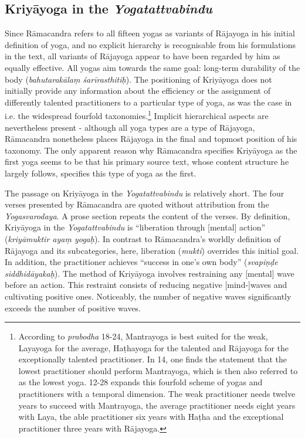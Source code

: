 \subsection{Kriyāyoga in the \textit{Yogatattvabindu}}
\label{kriyaintro}
Since Rāmacandra refers to all fifteen yogas as variants of Rājayoga in his initial definition of yoga, and no explicit hierarchy is recognisable from his formulations in the text, all variants of Rājayoga appear to have been regarded by him as equally effective. All yogas aim towards the same goal: long-term durability of the body (\textit{bahutarakālaṃ śarīrasthitiḥ}). The positioning of Kriyāyoga does not initially provide any information about the efficiency or the assignment of differently talented practitioners to a particular type of yoga, as was the case in i.e. the widespread fourfold taxonomies.\footnote{According to \textit{prabodha} 18-24, Mantrayoga is best suited for the weak, Layayoga for the average, Haṭhayoga for the talented and Rājayoga for the exceptionally talented practitioner. In  14, one finds the statement that the lowest practitioner should perform Mantrayoga, which is then also referred to as the lowest yoga.  12-28 expands this fourfold scheme of yogas and practitioners with a temporal dimension. The weak practitioner needs twelve years to succeed with Mantrayoga, the average practitioner needs eight years with Laya, the able practitioner six years with Haṭha and the exceptional practitioner three years with Rājayoga.} Implicit hierarchical aspects are nevertheless present - although all yoga types are a type of Rājayoga, Rāmacandra nonetheless places Rājayoga in the final and topmost position of his taxonomy.
The only apparent reason why Rāmacandra specifies Kriyāyoga as the first yoga seems to be that his primary source text, whose content structure he largely follows, specifies this type of yoga as the first.

The passage on Kriyāyoga in the \textit{Yogatattvabindu} is relatively short. The four verses presented by Rāmacandra are quoted without attribution from the \textit{Yogasvarodaya}. A prose section repeats the content of the verses. By definition, Kriyāyoga in the \textit{Yogatattvabindu} is ``liberation through [mental] action'' (\textit{kriyāmuktir ayaṃ yogaḥ}). In contrast to Rāmacandra's worldly definition of Rājayoga and its subcategories, here, liberation (\textit{mukti}) overrides this initial goal. In addition, the practitioner achieves ``success in one's own body'' (\textit{svapiṇḍe siddhidāyakaḥ}). The method of Kriyāyoga involves restraining any [mental] wave before an action. This restraint consists of reducing negative [mind-]waves and cultivating positive ones. Noticeably, the number of negative waves significantly exceeds the number of positive waves.

